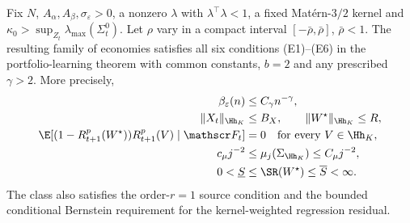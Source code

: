 \begin{proposition}
\label{prop:mc_assumptions}
Fix $N$, $A_\alpha,A_\beta,\sigma_\varepsilon>0$, a nonzero $\lambda$
with $\lambda^\top\lambda<1$, a fixed Mat\'ern-$3/2$ kernel and
$\kappa_0>\sup_{Z_t}\lambda_{\max}(\Sigma_t^0)$.
Let $\rho$ vary in a compact interval $[-\bar\rho,\bar\rho]$,
$\bar\rho<1$. The resulting family of economies satisfies all six
conditions (E1)--(E6) in the portfolio-learning theorem with common
constants, $b=2$ and any prescribed $\gamma>2$. More precisely,
\begin{align*}
\beta_\varepsilon(n)&\leq C_\gamma n^{-\gamma},\\
\|X_t\|_{\Hh_K}&\leq B_X,\qquad
\|W^\star\|_{\Hh_K}\leq R,\\
\E[(1-R^p_{t+1}(W^\star))R^p_{t+1}(V)\mid\mathscr F_t]&=0
\quad\text{for every }V\in\Hh_K,\\
c_\mu j^{-2}&\leq\mu_j(\Sigma_{\Hh_K})\leq C_\mu j^{-2},\\
0<\underline S&\leq\SR(W^\star)\leq\overline S<\infty.
\end{align*}
The class also satisfies the order-$r=1$ source condition and the bounded
conditional Bernstein requirement for the kernel-weighted regression residual.
\end{proposition}
